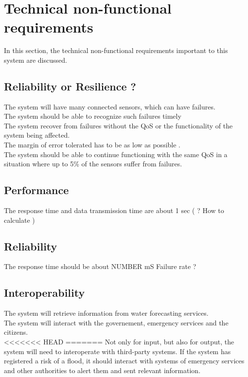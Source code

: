 \section{Technical non-functional requirements}
In this section, the technical non-functional requirements important to this system are discussed.

\subsection{Reliability or Resilience ? }

The system will have many connected sensors, which can have failures. \\
The system should be able to recognize such failures timely \\
The system recover from failures without the QoS or the functionality of the system being affected. \\
The margin of error tolerated has to be as low as possible .\\
The system should be able to continue functioning with the same QoS in a situation where up to 5\% of the sensors suffer from failures. \\ %

\subsection{Performance}
The response time and data transmission time are about 1 sec ( ? How to calculate ) \\

\subsection{Reliability}
The response time should be about NUMBER mS
Failure rate ?

\subsection{Interoperability}
The system will retrieve information from water forecasting services.\\ 
The system will interact with the governement, emergency services and the citizens.\\

<<<<<<< HEAD
=======
Not only for input, but also for output, the system will need to interoperate with third-party systems. If the system has registered a risk of a flood, it should interact with systems of emergency services and other authorities to alert them and sent relevant information.

